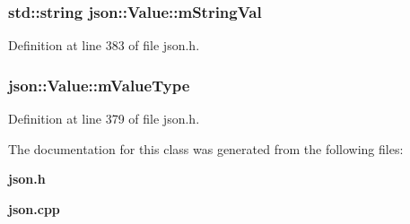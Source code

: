 \subsubsection[{m\+String\+Val}]{\setlength{\rightskip}{0pt plus 5cm}std\+::string json\+::\+Value\+::m\+String\+Val\hspace{0.3cm}{\ttfamily [protected]}}\label{classjson_1_1_value_a717929a5f3a0342a96e020d3d57f126a}


Definition at line 383 of file json.\+h.

\subsubsection[{m\+Value\+Type}]{ json\+::\+Value\+::m\+Value\+Type\hspace{0.3cm}{\ttfamily [protected]}}\label{classjson_1_1_value_afa7d945a4ba3c7b4facb6e3c03471136}


Definition at line 379 of file json.\+h.



The documentation for this class was generated from the following files\+:\begin{DoxyCompactItemize}
\item 
{\bf json.\+h}\item 
{\bf json.\+cpp}\end{DoxyCompactItemize}
